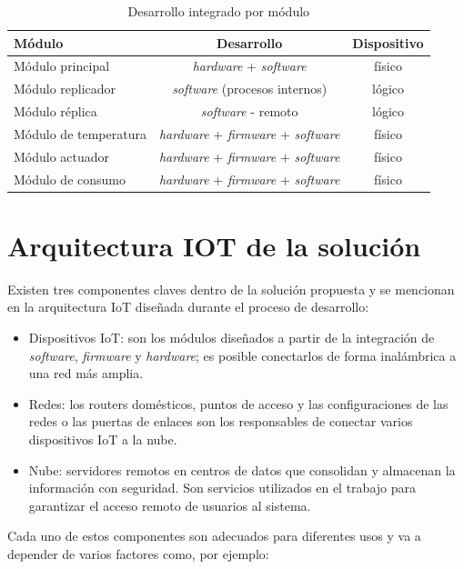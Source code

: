 \begin{table}[h]
	\centering
	\caption[Desarrollo integrado por módulo]{Desarrollo integrado por módulo}
	\begin{tabular}{l c c }    
		\toprule
		\textbf{Módulo} 	 & \textbf{Desarrollo}  & \textbf{Dispositivo}\\
		\midrule
		Módulo principal & \emph{hardware} + \emph{software} & físico\\		
		Módulo replicador & \emph{software} (procesos internos)& lógico \\
		Módulo réplica & \emph{software} - remoto & lógico \\
		Módulo de temperatura & \emph{hardware} + \emph{firmware} + \emph{software} & físico\\		
		Módulo actuador & \emph{hardware} + \emph{firmware} + \emph{software} & físico\\		
		Módulo de consumo	 & \emph{hardware} + \emph{firmware} + \emph{software} & físico\\
		
		\bottomrule
		\hline
	\end{tabular}
	\label{tab:tablamodulos}
\end{table}


\section{Arquitectura IOT de la solución}

Existen tres componentes claves dentro de la solución propuesta y se mencionan en la arquitectura IoT diseñada durante el proceso de desarrollo: 


\begin{itemize}
\item Dispositivos IoT: son los módulos diseñados a partir de la integración de \emph{software}, \emph{firmware} y \emph{hardware}; es posible conectarlos de forma inalámbrica a una red más amplia.
\item Redes: los routers domésticos, puntos de acceso y las configuraciones de las redes o las puertas de enlaces son los responsables de conectar varios dispositivos IoT a la nube.
\item Nube: servidores remotos en centros de datos que consolidan y almacenan la información con seguridad. Son servicios utilizados en el trabajo para garantizar el acceso remoto de usuarios al sistema.
\end{itemize}
\vspace{0.5cm}
Cada uno de estos componentes son adecuados para diferentes usos y va a depender de varios factores como, por ejemplo:

